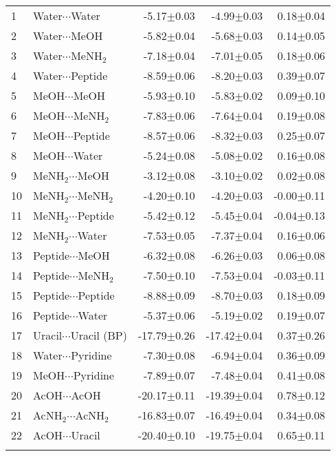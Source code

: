 \begin{longtable}{llrrr}
1 & Water$\cdots$Water & -5.17$\pm$0.03 & -4.99$\pm$0.03 & 0.18$\pm$0.04  \\
2 & Water$\cdots$MeOH & -5.82$\pm$0.04 & -5.68$\pm$0.03 & 0.14$\pm$0.05  \\
3 & Water$\cdots$MeNH$_2$ & -7.18$\pm$0.04 & -7.01$\pm$0.05 & 0.18$\pm$0.06  \\
4 & Water$\cdots$Peptide & -8.59$\pm$0.06 & -8.20$\pm$0.03 & 0.39$\pm$0.07  \\
5 & MeOH$\cdots$MeOH & -5.93$\pm$0.10 & -5.83$\pm$0.02 & 0.09$\pm$0.10  \\
6 & MeOH$\cdots$MeNH$_2$ & -7.83$\pm$0.06 & -7.64$\pm$0.04 & 0.19$\pm$0.08  \\
7 & MeOH$\cdots$Peptide & -8.57$\pm$0.06 & -8.32$\pm$0.03 & 0.25$\pm$0.07  \\
8 & MeOH$\cdots$Water & -5.24$\pm$0.08 & -5.08$\pm$0.02 & 0.16$\pm$0.08  \\
9 & MeNH$_2$$\cdots$MeOH & -3.12$\pm$0.08 & -3.10$\pm$0.02 & 0.02$\pm$0.08  \\
10 & MeNH$_2$$\cdots$MeNH$_2$ & -4.20$\pm$0.10 & -4.20$\pm$0.03 & -0.00$\pm$0.11  \\
11 & MeNH$_2$$\cdots$Peptide & -5.42$\pm$0.12 & -5.45$\pm$0.04 & -0.04$\pm$0.13  \\
12 & MeNH$_2$$\cdots$Water & -7.53$\pm$0.05 & -7.37$\pm$0.04 & 0.16$\pm$0.06  \\
13 & Peptide$\cdots$MeOH & -6.32$\pm$0.08 & -6.26$\pm$0.03 & 0.06$\pm$0.08  \\
14 & Peptide$\cdots$MeNH$_2$ & -7.50$\pm$0.10 & -7.53$\pm$0.04 & -0.03$\pm$0.11  \\
15 & Peptide$\cdots$Peptide & -8.88$\pm$0.09 & -8.70$\pm$0.03 & 0.18$\pm$0.09  \\
16 & Peptide$\cdots$Water & -5.37$\pm$0.06 & -5.19$\pm$0.02 & 0.19$\pm$0.07  \\
17 & Uracil$\cdots$Uracil (BP) & -17.79$\pm$0.26 & -17.42$\pm$0.04 & 0.37$\pm$0.26  \\
18 & Water$\cdots$Pyridine & -7.30$\pm$0.08 & -6.94$\pm$0.04 & 0.36$\pm$0.09  \\
19 & MeOH$\cdots$Pyridine & -7.89$\pm$0.07 & -7.48$\pm$0.04 & 0.41$\pm$0.08  \\
20 & AcOH$\cdots$AcOH & -20.17$\pm$0.11 & -19.39$\pm$0.04 & 0.78$\pm$0.12  \\
21 & AcNH$_2$$\cdots$AcNH$_2$ & -16.83$\pm$0.07 & -16.49$\pm$0.04 & 0.34$\pm$0.08  \\
22 & AcOH$\cdots$Uracil & -20.40$\pm$0.10 & -19.75$\pm$0.04 & 0.65$\pm$0.11  \\
$$
\end{longtable}
